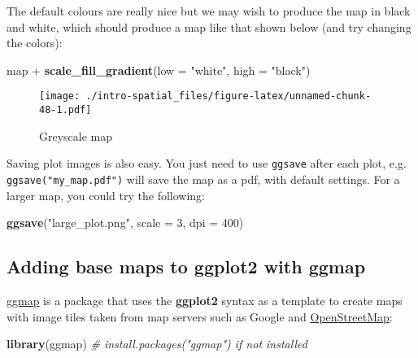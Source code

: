 \documentclass[]{article}
\newenvironment{Shaded}{}{}
\newcommand{\KeywordTok}[1]{\textcolor[rgb]{0.00,0.44,0.13}{\textbf{{#1}}}}
\newcommand{\DataTypeTok}[1]{\textcolor[rgb]{0.56,0.13,0.00}{{#1}}}
\newcommand{\DecValTok}[1]{\textcolor[rgb]{0.25,0.63,0.44}{{#1}}}
\newcommand{\StringTok}[1]{\textcolor[rgb]{0.25,0.44,0.63}{{#1}}}
\newcommand{\CommentTok}[1]{\textcolor[rgb]{0.38,0.63,0.69}{\textit{{#1}}}}
\newcommand{\NormalTok}[1]{{#1}}
\begin{document}
The default colours are really nice but we may wish to produce the map
in black and white, which should produce a map like that shown below
(and try changing the colors):

\begin{Shaded}
\begin{Highlighting}[]
\NormalTok{map +}\StringTok{ }\KeywordTok{scale_fill_gradient}\NormalTok{(}\DataTypeTok{low =} \StringTok{"white"}\NormalTok{, }\DataTypeTok{high =} \StringTok{"black"}\NormalTok{)}
\end{Highlighting}
\end{Shaded}

\begin{figure}[htbp]
\centering
\texttt{[image: ./intro-spatial\_files/figure-latex/unnamed-chunk-48-1.pdf]}
\caption{Greyscale map}
\end{figure}

Saving plot images is also easy. You just need to use \texttt{ggsave}
after each plot, e.g. \texttt{ggsave("my\_map.pdf")} will save the map
as a pdf, with default settings. For a larger map, you could try the
following:

\begin{Shaded}
\begin{Highlighting}[]
\KeywordTok{ggsave}\NormalTok{(}\StringTok{"large_plot.png"}\NormalTok{, }\DataTypeTok{scale =} \DecValTok{3}\NormalTok{, }\DataTypeTok{dpi =} \DecValTok{400}\NormalTok{)}
\end{Highlighting}
\end{Shaded}

\subsection{Adding base maps to ggplot2 with
ggmap}\label{adding-base-maps-to-ggplot2-with-ggmap}

\href{http://journal.r-project.org/archive/2013-1/kahle-wickham.pdf}{ggmap}
is a package that uses the \textbf{ggplot2} syntax as a template to
create maps with image tiles taken from map servers such as Google and
\href{http://www.openstreetmap.org/}{OpenStreetMap}:

\begin{Shaded}
\begin{Highlighting}[]
\KeywordTok{library}\NormalTok{(ggmap) }\CommentTok{# install.packages("ggmap") if not installed}
\end{Highlighting}
\end{Shaded}
\end{document}
